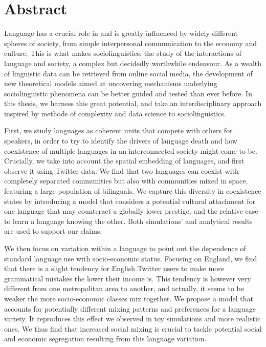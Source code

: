 \documentclass[../thesis.tex]{subfiles}
\begin{document}
\begingroup
\let\cleardoublepage\relax
\let\cleardoublepage\relax

\chapter*{Abstract}
Language has a crucial role in and is greatly influenced by widely different spheres of
society, from simple interpersonal communication to the economy and culture. This is
what makes sociolinguistics, the study of the interactions of language and society, a
complex but decidedly worthwhile endeavour. As a wealth of linguistic data can be
retrieved from online social media, the development of new theoretical models aimed at
uncovering mechanisms underlying sociolinguistic phenomena can be better guided and
tested than ever before. In this thesis, we harness this great potential, and take an
interdisciplinary approach inspired by methods of complexity and data science to
sociolinguistics.

First, we study languages as coherent units that compete with others for speakers, in
order to try to identify the drivers of language death and how coexistence of multiple
languages in an interconnected society might come to be. Crucially, we take into account
the spatial embedding of languages, and first observe it using Twitter data. We find
that two languages can coexist with completely separated communities but also with
communities mixed in space, featuring a large population of bilinguals. We capture this
diversity in coexistence states by introducing a model that considers a potential
cultural attachment for one language that may counteract a globally lower prestige, and
the relative ease to learn a language knowing the other. Both simulations' and
analytical results are used to support our claims.

We then focus on variation within a language to point out the dependence of standard
language use with socio-economic status. Focusing on England, we find
that there is a slight tendency for English Twitter users to make more grammatical
mistakes the lower their income is. This tendency is however very different from one
metropolitan area to another, and actually, it seems to be weaker the more
socio-economic classes mix together. We propose a model that accounts for potentially
different mixing patterns and preferences for a language variety. It reproduces this
effect we observed in toy simulations and more realistic ones.
We thus find that increased social mixing is crucial to tackle potential social and
economic segregation resulting from this language variation.
\end{document}
